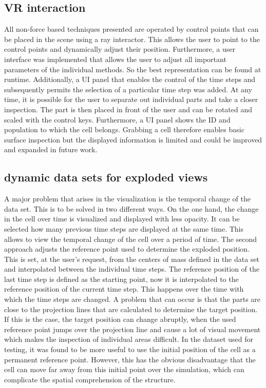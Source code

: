 \subsection{VR interaction}

All non-force based techniques presented are operated by control points that can be placed in the scene using a ray interactor. 
This allows the user to point to the control points and dynamically adjust their position. %
Furthermore, a user interface was implemented that allows the user to adjust all important parameters of the individual methods. 
So the best representation can be found at runtime.  
Additionally, a UI panel that enables the control of the time steps and subsequently permits the selection of a particular time step was added.
At any time, it is possible for the user to separate out individual parts and take a closer inspection. 
The part is then placed in front of the user and can be rotated and scaled with the control keys. Furthermore, a UI panel shows the ID and population to which the cell belongs. 
Grabbing a cell therefore enables basic surface inspection but the displayed information is limited and could be improved and expanded in future work. 

\subsection{dynamic data sets for exploded views}

A major problem that arises in the visualization is the temporal change of the data set. This is to be solved in two different ways.
On the one hand, the change in the cell over time is visualized and displayed with less opacity.
It can be selected how many previous time steps are displayed at the same time.
This allows to view the temporal change of the cell over a period of time. %
The second approach adjusts the reference point used to determine the exploded position. 
This is set, at the user's request, from the centers of mass defined in the data set and interpolated between the individual time steps.
The reference position of the last time step is defined as the starting point, now it is interpolated to the reference position of the current time step. This happens over the time with which the time steps are changed. 
A problem that can occur is that the parts are close to the projection lines that are calculated to determine the target position. 
If this is the case, the target position can change abruptly, when the used reference point jumps over the projection line and cause a lot of visual movement which makes the inspection of individual areas difficult.  
In the dataset used for testing, it was found to be more useful to use the initial position of the cell as a permanent reference point. 
However, this has the obvious disadvantage that the cell can move far away from this initial point over the simulation, which can complicate the spatial comprehension of the structure. 



